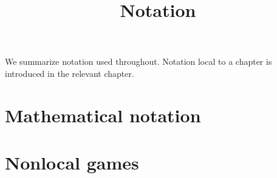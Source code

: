 

%



\title{Notation}
\label{notation}

\maketitle

\label{section-phantom}

\tableofcontents

We summarize notation used throughout. Notation local to a chapter is introduced in the relevant chapter. 


\section{Mathematical notation}
\label{section-mathnotation}


\section{Nonlocal games}
\label{section-gamesnotation}










